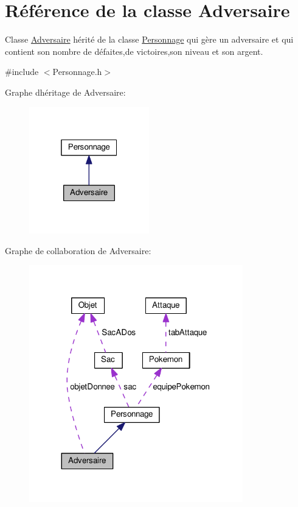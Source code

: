 \hypertarget{class_adversaire}{}\section{Référence de la classe Adversaire}
\label{class_adversaire}


Classe \hyperlink{class_adversaire}{Adversaire} hérité de la classe \hyperlink{class_personnage}{Personnage} qui gère un adversaire et qui contient son nombre de défaites,de victoires,son niveau et son argent.  




{\ttfamily \#include $<$Personnage.\+h$>$}



Graphe d\textquotesingle{}héritage de Adversaire\+:\nopagebreak
\begin{figure}[H]
\begin{center}
\leavevmode
\includegraphics[width=148pt]{class_adversaire__inherit__graph}
\end{center}
\end{figure}


Graphe de collaboration de Adversaire\+:\nopagebreak
\begin{figure}[H]
\begin{center}
\leavevmode
\includegraphics[width=263pt]{class_adversaire__coll__graph}
\end{center}
\end{figure}
